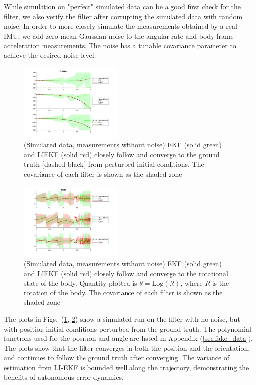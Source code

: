 While simulation on "perfect" simulated data can be a good first check for the filter, we also verify the filter after corrupting the simulated data with random noise.  In order to more closely simulate the measurements obtained by a real IMU, we add zero mean Gaussian noise to the angular rate and body frame acceleration measurements. The noise has a tunable covariance parameter to achieve the desired noise level.

\begin{figure}
    \centering
    \includegraphics[width=0.45\textwidth]{sections/figures/fake_data_position_nonoise.png}
    \caption{(Simulated data, measurements without noise) EKF (solid green) and LIEKF (solid red) closely follow and converge to the ground truth (dashed black) from perturbed initial conditions. The covariance of each filter is shown as the shaded zone}
    \label{fig:fake_data_pos}
\end{figure}

\begin{figure}
    \centering
    \includegraphics[width=0.45\textwidth]{sections/figures/fake_data_theta_nonoise.png}
    \caption{(Simulated data, measurements without noise) EKF (solid green) and LIEKF (solid red) closely follow and converge to the rotational state of the body. Quantity plotted is $\theta = \mathrm{Log}(R)$, where $R$ is the rotation of the body. The covariance of each filter is shown as the shaded zone}
    \label{fig:fake_data_ang}
\end{figure}

The plots in Figs.~(\ref{fig:fake_data_pos}, \ref{fig:fake_data_ang}) show a simulated run on the filter with no noise, but with position initial conditions perturbed from the ground truth.  The polynomial functions used for the position and angle are listed in Appendix (\ref{sec:fake_data}).  The plots show that the filter converges in both the position and the orientation, and continues to follow the ground truth after converging. The variance of estimation from LI-EKF is bounded well along the trajectory, demonstrating the benefits of autonomous error dynamics.

